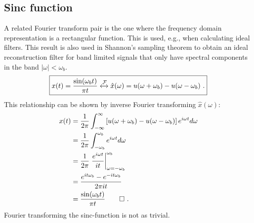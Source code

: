 \subsection{Sinc function}
A related Fourier transform pair is the one where the frequency domain representation 
is a rectangular function. This is used, e.g., when calculating ideal filters.
This result is also used in Shannon's sampling theorem to obtain an ideal 
reconstruction filter for band limited signals that only have spectral components in the band
$|\omega| < \omega_b$.
\begin{equation}
    \boxed{
        x(t) = \frac{\sin(\omega_b t)}{\pi t} \xleftrightarrow{\mathcal{F}} \hat{x}(\omega) = u(\omega+\omega_b) - u(\omega-\omega_b)\,\,.
    }
    \label{eq:ft:sinc}
\end{equation}
This relationship can be shown by inverse Fourier transforming $\hat{x}(\omega)$:
\begin{align}
    x(t) & = \frac{1}{2\pi}\int_{-\infty}^{\infty} \left[u(\omega+\omega_b) - u(\omega-\omega_b)\right] e^{i\omega t}d\omega \\
         & = \frac{1}{2\pi}\int_{-\omega_b}^{\omega_b} e^{i\omega t}d\omega                                                  \\
         & = \frac{1}{2\pi}\left.\frac{e^{i\omega t}}{it}\right|_{\omega=-\omega_b}^{\omega_b}                               \\
         & = \frac{e^{i t \omega_b} - e^{-i t \omega_b} }{ 2\pi i t}                                                         \\
         & = \frac{\sin(\omega_b t)}{\pi t}\qed\,\,.
\end{align}
Fourier transforming the sinc-function is not as trivial.

